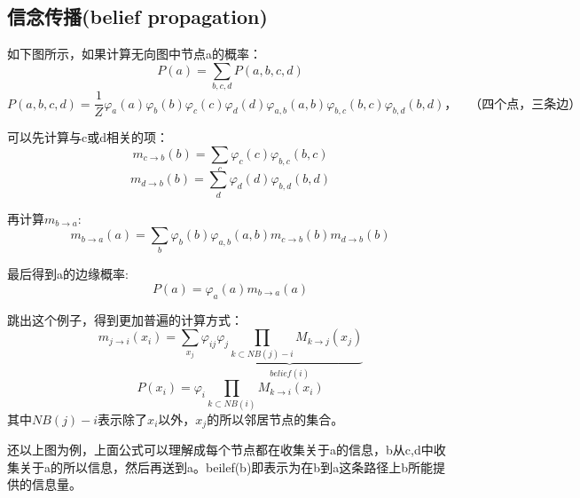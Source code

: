 \documentclass[UTF8]{ctexart} %
\begin{document}
		\subsection{信念传播(belief propagation)}
			如下图所示，如果计算无向图中节点a的概率：
			\[P(a) = \sum_{b,c,d}P(a,b,c,d)\]
			\[P(a,b,c,d) = \frac{1}{Z}\varphi_a(a)\varphi_b(b)\varphi_c(c)\varphi_d(d)\varphi_{a,b}(a,b)\varphi_{b,c}(b,c)\varphi_{b,d}(b,d)，\quad\text{（四个点，三条边）}\]
			\begin{figure}[H]
			\end{figure}
			
			可以先计算与c或d相关的项：
			\[m_{c\rightarrow b}(b) =\sum_c\varphi_c(c) \varphi_{b,c}(b,c)\]
			\[m_{d\rightarrow b}(b) =\sum_d\varphi_d(d) \varphi_{b,d}(b,d)\]
			
			再计算$m_{b\rightarrow a}$:
			\[m_{b\rightarrow a}(a) = \sum_b\varphi_b(b)\varphi_{a,b}(a,b)m_{c\rightarrow b}(b)m_{d\rightarrow b}(b)\]
			
			最后得到a的边缘概率:
			\[P(a) = \varphi_a(a)m_{b\rightarrow a}(a)\]
			
			跳出这个例子，得到更加普遍的计算方式：
			\[m_{j\rightarrow i}(x_i) = \sum_{x_j}\varphi_{ij}\underbrace{\varphi_j \prod_{k\subset NB(j)-i}M_{k\rightarrow j}(x_j)}_{belief(i)}\]
			\[P(x_i) = \varphi_i \prod_{k\subset NB(i)}M_{k\rightarrow i}(x_i)\]
			其中$NB(j)-i$表示除了$x_i$以外，$x_j$的所以邻居节点的集合。
			
			还以上图为例，上面公式可以理解成每个节点都在收集关于a的信息，b从c,d中收集关于a的所以信息，然后再送到a。beilef(b)即表示为在b到a这条路径上b所能提供的信息量。
			
\end{document}
